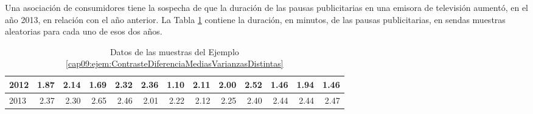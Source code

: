 \begin{ejemplo}
\label{cap09:ejem:ContrasteDiferenciaMediasVarianzasDistintas}
Una asociación de consumidores tiene la sospecha de que la duración de las pausas publicitarias en una emisora de televisión aumentó, en el año 2013, en relación con el año anterior. La Tabla \ref{cap09:tabla:ejemploContrasteDiferneciaMediasVarianzasDistintas} contiene la duración, en minutos, de las pausas publicitarias, en sendas muestras aleatorias para cada uno de esos dos años.

\begin{table}[htb]
\centering
{\small
\begin{tabular}{|l|rrrrrrrrrrrr|}
  \hline
2012 & 1.87 & 2.14 & 1.69 & 2.32 & 2.36 & 1.10 & 2.11 & 2.00 & 2.52 & 1.46 & 1.94 & 1.46 \\
\hline
2013 & 2.37 & 2.30 & 2.65 & 2.46 & 2.01 & 2.22 & 2.12 & 2.25 & 2.40 & 2.44 & 2.44 & 2.47 \\
\hline
\end{tabular}
}
\caption{Datos de las muestras del Ejemplo \ref{cap09:ejem:ContrasteDiferenciaMediasVarianzasDistintas}}
\label{cap09:tabla:ejemploContrasteDiferneciaMediasVarianzasDistintas}
\end{table}


\end{ejemplo}
